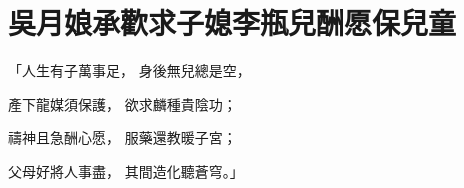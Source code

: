 %

\chapter{吳月娘承歡求子媳\KG 李瓶兒酬愿保兒童}


\begin{showcontents}{}



「人生有子萬事足，  身後無兒總是空，

產下龍媒須保護，  欲求麟種貴陰功；

禱神且急酬心愿，  服藥還教暖子宮；

父母好將人事盡，  其間造化聽蒼穹。」


\end{showcontents}
